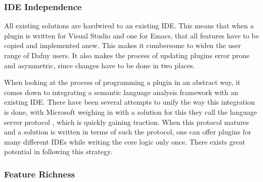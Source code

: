 \subsubsection{IDE Independence}
All existing solutions are hardwired to an existing IDE. This means that when a plugin is written for Visual Studio and one for Emacs, that all features have to be copied and implemented anew. This makes it cumbersome to widen the user range of Dafny users. It also makes the process of updating plugins error prone and asymmetric, since changes have to be done in two places. \newline

When looking at the process of programming a plugin in an abstract way, it comes down to integrating a semantic language analysis framework with an existing IDE. There have been several attempts to unify the way this integration is done, with Microsoft weighing in with a solution for this they call the language server protocol \cite{langserver}, which is quickly gaining traction. When this protocol matures and a solution is written in terms of such the protocol, one can offer plugins for many different IDEs while writing the core logic only once. There exists great potential in following this strategy. 
\newline

\subsubsection{Feature Richness}

